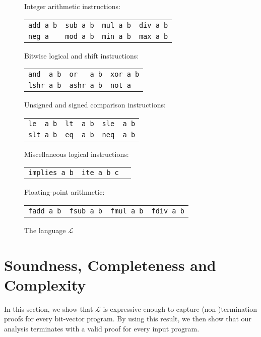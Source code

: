 \documentclass[a4paper]{llncs}
\begin{document}
\begin{figure}
\begin{center}
{\small

\setlength{\tabcolsep}{14pt}
Integer arithmetic instructions:

\begin{tabular}{llll}
 \verb|add a b| & \verb|sub a b| & \verb|mul a b| & \verb|div a b| \\
 \verb|neg a| &   \verb|mod a b| & \verb|min a b| & \verb|max a b|
\end{tabular}

\medskip

Bitwise logical and shift instructions:

\begin{tabular}{lll}
 \verb|and  a b| & \verb|or   a b| & \verb|xor a b| \\
 \verb|lshr a b| & \verb|ashr a b| & \verb|not a|
\end{tabular}

\medskip

Unsigned and signed comparison instructions:

\begin{tabular}{lll}
 \verb|le  a b| & \verb|lt  a b| & \verb|sle  a b| \\
 \verb|slt a b| & \verb|eq  a b| & \verb|neq  a b| \\
\end{tabular}

\medskip

Miscellaneous logical instructions:

\begin{tabular}{lll}
 \verb|implies a b| & \verb|ite a b c| &  \\
\end{tabular}

\medskip

\setlength{\tabcolsep}{12pt}

Floating-point arithmetic:

\begin{tabular}{llll}
 \verb|fadd a b| & \verb|fsub a b| & \verb|fmul a b| & \verb|fdiv a b|
\end{tabular}

}
\end{center}

 \caption{The language $\mathcal{L}$}
 \label{fig:l-language}
\end{figure}


\section{Soundness, Completeness and Complexity}
In this section, we show that $\mathcal{L}$ is expressive enough
to capture  (non-)termination proofs for every bit-vector program.
By using this result, %
we then show that our analysis terminates with a valid proof for every input program.
\end{document}

